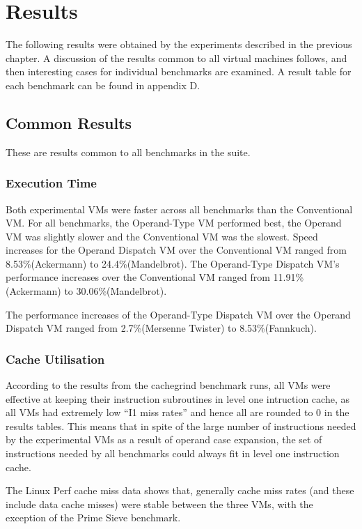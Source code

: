\documentclass[english,a4paper,12pt]{report}
\begin{document}
\chapter{Results}

The following results were obtained by the experiments described in
the previous chapter. A discussion of the results common to all
virtual machines follows, and then interesting cases for individual
benchmarks are examined. A result table for each benchmark can be
found in appendix D.

\section{Common Results}

These are results common to all benchmarks in the suite.

\subsection{Execution Time}
Both experimental VMs were faster across all benchmarks than the
Conventional VM. For all benchmarks, the Operand-Type VM performed
best, the Operand VM was slightly slower and the Conventional VM was
the slowest. Speed increases for the Operand Dispatch VM over the
Conventional VM ranged from 8.53\%(Ackermann) to
24.4\%(Mandelbrot). The Operand-Type Dispatch VM's performance
increases over the Conventional VM ranged from 11.91\%(Ackermann) to
30.06\%(Mandelbrot). 

The performance increases of the Operand-Type Dispatch VM over the
Operand Dispatch VM ranged from 2.7\%(Mersenne Twister) to
8.53\%(Fannkuch).

\subsection{Cache Utilisation}
According to the results from the cachegrind benchmark runs, all VMs
were effective at keeping their instruction subroutines in level one
intruction cache, as all VMs had extremely low ``I1 miss rates'' and
hence all are rounded to 0 in the results tables. This means that in
spite of the large number of instructions needed by the experimental
VMs as a result of operand case expansion, the set of instructions
needed by all benchmarks could always fit in level one instruction
cache.

The Linux Perf cache miss data shows that, generally cache miss rates
(and these include data cache misses) were stable between the three
VMs, with the exception of the Prime Sieve benchmark.
\end{document}
